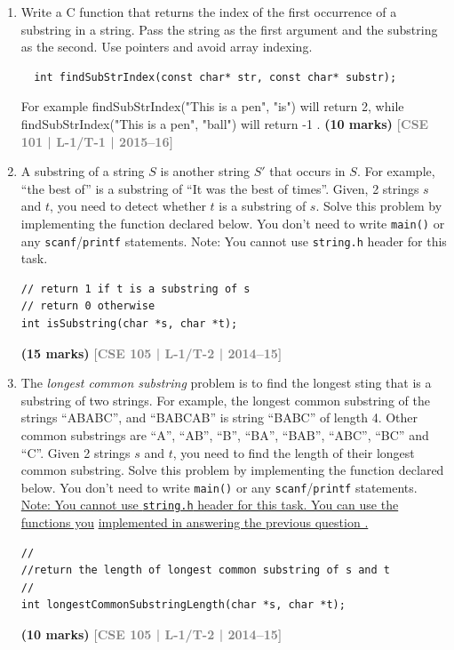 \documentclass[12pt,a3paper]{article}
\newcommand{\yr}[1]{\hfill\textcolor{gray}{\small\textbf{[#1]}}}
\newcommand{\mk}[1]{\textcolor{orange!70!black}{\small\textbf{(#1 marks)}}}
\begin{document}
\begin{enumerate}
\mk{15} \yr{CSE 101 | L-1/T-1 | 2015--16}

\item Write a C function that returns the index of the first occurrence of a substring in a string. Pass the string as the first argument and the substring as the second. Use pointers and avoid array indexing.
\begin{lstlisting}
  int findSubStrIndex(const char* str, const char* substr);
\end{lstlisting}
For example findSubStrIndex("This is a pen", "is") will return 2, while findSubStrIndex("This is a pen", "ball") will return -1 .
\mk{10} \yr{CSE 101 | L-1/T-1 | 2015--16}

\item A substring of a string $S$ is another string $S'$ that occurs in $S$. For example, ``the best of'' is a substring of ``It was the best of times''. Given, 2 strings $s$ and $t$, you need to detect whether $t$ is a substring of $s$. Solve this problem by implementing the function declared below. You don't need to write \texttt{main()} or any \texttt{scanf}/\texttt{printf} statements. Note: You cannot use \texttt{string.h} header for this task.

\begin{lstlisting}
// return 1 if t is a substring of s
// return 0 otherwise
int isSubstring(char *s, char *t);
\end{lstlisting}
\mk{15} \yr{CSE 105 | L-1/T-2 | 2014--15}

\item The \textit{longest common substring} problem is to find the longest sting that is a substring of two strings. For example, the longest common substring of the strings ``ABABC'', and ``BABCAB'' is string ``BABC'' of length 4. Other common substrings are ``A'', ``AB'', ``B'', ``BA'', ``BAB'', ``ABC'', ``BC'' and ``C''. Given 2 strings $s$ and $t$, you need to find the length of their longest common substring. Solve this problem by implementing the function declared below. You don't need to write \texttt{main()} or any \texttt{scanf}/\texttt{printf} statements. \\
\underline{Note: You cannot use \texttt{string.h} header for this task. You can use the functions you} \underline{implemented in answering the previous question .}

\begin{lstlisting}
//
//return the length of longest common substring of s and t
//
int longestCommonSubstringLength(char *s, char *t);
\end{lstlisting}
\mk{10} \yr{CSE 105 | L-1/T-2 | 2014--15}


\end{enumerate}
\end{document}
